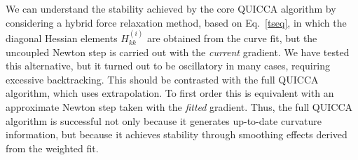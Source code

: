 \documentclass[prl,aps,preprint,showpacs,superbib]{revtex4}
\begin{document}
We can understand the stability achieved by the core QUICCA
algorithm by considering a hybrid force relaxation method, based on Eq.~\ref{tseq},
in which the diagonal Hessian elements $H^{(i)}_{kk}$ are obtained from the 
curve fit, but the uncoupled Newton step is carried out with the {\em current} 
gradient.  We have tested this alternative, but it turned out to be oscillatory 
in many cases, requiring excessive backtracking.  This should be contrasted with the
full QUICCA algorithm, which uses extrapolation. To first order this is equivalent with 
an approximate Newton step taken with the {\em fitted} gradient.   Thus, the full 
QUICCA algorithm is successful not only because it generates up-to-date curvature information, 
but because it achieves stability through smoothing effects derived from the weighted fit.
\end{document}
